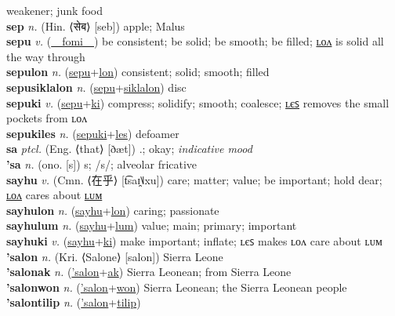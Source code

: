 weakener; junk food \label{setlukiles} \\
\textbf{sep} \textit{n.} (Hin. ⟨सेब⟩ [seb])
apple; Malus \label{sep} \\
\textbf{sepu} \textit{v.} (\hyperref[fomi]{~~fomi~~})
be consistent; be solid; be smooth; be filled; \hyperref[sepulon]{ʟᴏᴧ} is solid all the way through \label{sepu} \\
\textbf{sepulon} \textit{n.} (\hyperref[sepu]{sepu}+\hyperref[lon]{lon})
consistent; solid; smooth; filled \label{sepulon} \\
\textbf{sepusiklalon} \textit{n.} (\hyperref[sepu]{sepu}+\hyperref[siklalon]{siklalon})
disc \label{sepusiklalon} \\
\textbf{sepuki} \textit{v.} (\hyperref[sepu]{sepu}+\hyperref[ki]{ki})
compress; solidify; smooth; coalesce; \hyperref[sepukiles]{ʟєꜱ} removes the small pockets from ʟᴏᴧ \label{sepuki} \\
\textbf{sepukiles} \textit{n.} (\hyperref[sepuki]{sepuki}+\hyperref[les]{les})
defoamer \label{sepukiles} \\
\textbf{sa} \textit{ptcl.} (Eng. ⟨that⟩ [ðæt])
.; okay; \textit{indicative mood} \label{sa} \\
\textbf{'sa} \textit{n.} (ono. [s])
s; /s/; alveolar fricative \label{'sa} \\
\textbf{sayhu} \textit{v.} (Cmn. ⟨在乎⟩ [t͡saɪ̯˥˩xu])
care; matter; value; be important; hold dear; \hyperref[sayhulon]{ʟᴏᴧ} cares about \hyperref[sayhulum]{ʟᴜᴍ} \label{sayhu} \\
\textbf{sayhulon} \textit{n.} (\hyperref[sayhu]{sayhu}+\hyperref[lon]{lon})
caring; passionate \label{sayhulon} \\
\textbf{sayhulum} \textit{n.} (\hyperref[sayhu]{sayhu}+\hyperref[lum]{lum})
value; main; primary; important \label{sayhulum} \\
\textbf{sayhuki} \textit{v.} (\hyperref[sayhu]{sayhu}+\hyperref[ki]{ki})
make important; inflate; ʟєꜱ makes ʟᴏᴧ care about ʟᴜᴍ \label{sayhuki} \\
\textbf{'salon} \textit{n.} (Kri. ⟨Salone⟩ [salon])
Sierra Leone \label{'salon} \\
\textbf{'salonak} \textit{n.} (\hyperref['salon]{'salon}+\hyperref[ak]{ak})
Sierra Leonean; from Sierra Leone \label{'salonak} \\
\textbf{'salonwon} \textit{n.} (\hyperref['salon]{'salon}+\hyperref[won]{won})
Sierra Leonean; the Sierra Leonean people \label{'salonwon} \\
\textbf{'salontilip} \textit{n.} (\hyperref['salon]{'salon}+\hyperref[tilip]{tilip})
